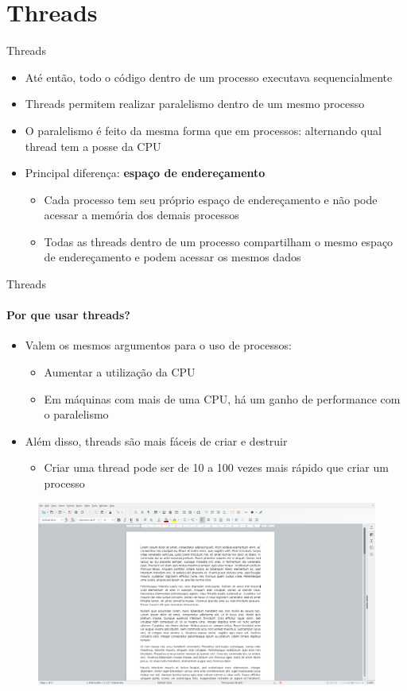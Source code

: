 \documentclass{beamer}
\begin{document}
\section{Threads}
\begin{frame}{Threads}
	\begin{itemize}
		\item Até então, todo o código dentro de um processo executava sequencialmente
		\item Threads permitem realizar paralelismo dentro de um mesmo processo
		\item O paralelismo é feito da mesma forma que em processos: alternando qual thread tem a posse da CPU
		\item Principal diferença: \textbf{espaço de endereçamento}
		\begin{itemize}
			\item Cada processo tem seu próprio espaço de endereçamento e não pode acessar a memória dos demais processos
			\item Todas as threads dentro de um processo compartilham o mesmo espaço de endereçamento e podem acessar os mesmos dados
		\end{itemize}
	\end{itemize}
\end{frame}
\begin{frame}{Threads}
	\framesubtitle{Por que usar threads?}
	\begin{itemize}
		\item Valem os mesmos argumentos para o uso de processos:
		\begin{itemize}
			\item Aumentar a utilização da CPU
			\item Em máquinas com mais de uma CPU, há um ganho de performance com o paralelismo
		\end{itemize}
		\item Além disso, threads são mais fáceis de criar e destruir
		\begin{itemize}
			\item Criar uma thread pode ser de 10 a 100 vezes mais rápido que criar um processo
		\end{itemize}
	\end{itemize}
	\begin{figure}
		\includegraphics[width=0.6\paperwidth]{resources/editor}
	\end{figure}
\end{frame}
\end{document}
